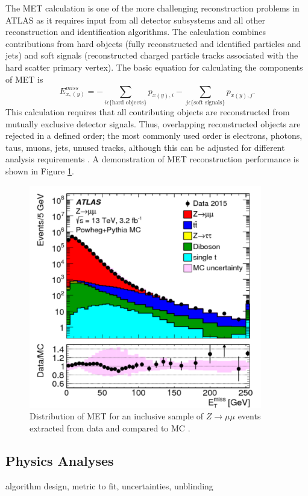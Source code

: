 The MET calculation is one of the more challenging reconstruction problems in ATLAS as it requires input from all detector subsystems and all other reconstruction and identification algorithms. The calculation combines contributions from hard objects (fully reconstructed and identified particles and jets) and soft signals (reconstructed charged particle tracks associated with the hard scatter primary vertex). The basic equation for calculating the components of MET is $$E_{x,(y)}^{miss}=-\sum_{i\epsilon\{\text{hard objects}\}}p_{x(y),i}-\sum_{j\epsilon\{\text{soft signals}\}}p_{x(y),j}.$$ This calculation requires that all contributing objects are reconstructed from mutually exclusive detector signals. Thus, overlapping reconstructed objects are rejected in a defined order; the most commonly used order is electrons, photons, taus, muons, jets, unused tracks, although this can be adjusted for different analysis requirements \cite{met_run2}. A demonstration of MET reconstruction performance is shown in Figure \ref{fig:met_eff}.\\

\begin{figure}[htb!]
    \centering
    \includegraphics[width=4in]{figures/chapter3/met_eff.pdf}
    \caption{Distribution of MET for an inclusive sample of $Z\rightarrow\mu\mu$ events extracted from data and compared to MC \cite{met_run2}.}
    \label{fig:met_eff}
\end{figure}

\subsection{Physics Analyses}
algorithm design, metric to fit, uncertainties, unblinding